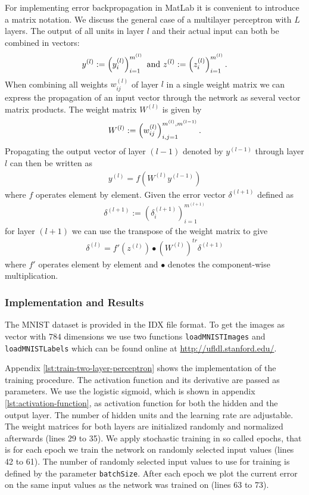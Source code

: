 For implementing error backpropagation in MatLab it is convenient to introduce a matrix notation. We discuss the general case of a multilayer perceptron with $L$ layers. The output of all units in layer $l$ and their actual input can both be combined in vectors:
\begin{align}
y^{(l)} := \left( y_i ^{(l)} \right)_{i = 1}^{m^{(l)}} \text{ and } z^{(l)} := \left( z_i^{(l)} \right)_{i = 1}^{m^{(l)}}\onedot
\end{align}
When combining all weights $w_{ij}^{(l)}$ of layer $l$ in a single weight matrix we can express the propagation of an input vector through the network as several vector matrix products. The weight matrix $W^{(l)}$ is given by
\begin{align}
W^{(l)} := \left(w_{ij}^{(l)}\right)_{i,j = 1}^{m^{(l)},m^{(l-1)}}\onedot
\end{align}
Propagating the output vector of layer $(l - 1)$ denoted by $y^{(l-1)}$ through layer $l$ can then be written as
\begin{align}
y^{(l)} = f\left(W^{(l)}y^{(l-1)}\right)
\end{align}
where $f$ operates element by element. Given the error vector $\delta ^{(l+1)}$ defined as
\begin{align}
\delta^{(l+1)} := \left(\delta_i^{(l+1)}\right)_{i = 1}^{m^{(l+1)}}
\end{align}
for layer $(l+1)$ we can use the transpose of the weight matrix to give
\begin{align}
\delta ^{(l)} = f'(z^{(l)}) \bullet \left(W^{(l)}\right)^{tr} \delta^{(l+1)}
\end{align}
where $f'$ operates element by element and $\bullet$ denotes the component-wise multiplication.

\subsubsection{Implementation and Results}

The MNIST dataset is provided in the IDX file format. To get the images as vector with $784$ dimensions we use two functions \lstinline{loadMNISTImages} and \lstinline{loadMNISTLabels} which can be found online at \href{http://ufldl.stanford.edu/}{http://ufldl.stanford.edu/}.

Appendix \ref{lst:train-two-layer-perceptron} shows the implementation of the training procedure. The activation function and its derivative are passed as parameters. We use the logistic sigmoid, which is shown in appendix \ref{lst:activation-function}, as activation function for both the hidden and the output layer. The number of hidden units and the learning rate are adjustable. The weight matrices for both layers are initialized randomly and normalized afterwards (lines 29 to 35). We apply stochastic training in so called epochs, that is for each epoch we train the network on randomly selected input values (lines 42 to 61). The number of randomly selected input values to use for training is defined by the parameter \lstinline{batchSize}. After each epoch we plot the current error on the same input values as the network was trained on (lines 63 to 73).

